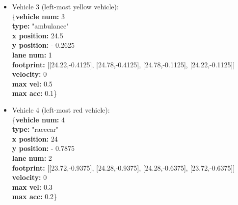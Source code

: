 \begin{itemize}
    \item Vehicle 3 (left-most yellow vehicle):
    \\\hspace*{7.5mm} \{\textbf{vehicle num:} 3
    \\\hspace*{10mm} \textbf{type:} "ambulance"
    \\\hspace*{10mm} \textbf{x position:} 24.5
    \\\hspace*{10mm} \textbf{y position:} - 0.2625
    \\\hspace*{10mm} \textbf{lane num:} 1
    \\\hspace*{10mm} \textbf{footprint:} [[24.22,-0.4125], [24.78,-0.4125], [24.78,-0.1125], [24.22,-0.1125]]
    \\\hspace*{10mm} \textbf{velocity:} 0
    \\\hspace*{10mm} \textbf{max vel:} 0.5
    \\\hspace*{10mm} \textbf{max acc:} 0.1\}
    
    \item Vehicle 4 (left-most red vehicle):
    \\\hspace*{7.5mm} \{\textbf{vehicle num:} 4
    \\\hspace*{10mm} \textbf{type:} "racecar"
    \\\hspace*{10mm} \textbf{x position:} 24
    \\\hspace*{10mm} \textbf{y position:} - 0.7875
    \\\hspace*{10mm} \textbf{lane num:} 2
    \\\hspace*{10mm} \textbf{footprint:} [[23.72,-0.9375], [24.28,-0.9375], [24.28,-0.6375], [23.72,-0.6375]]
    \\\hspace*{10mm} \textbf{velocity:} 0
    \\\hspace*{10mm} \textbf{max vel:} 0.3
    \\\hspace*{10mm} \textbf{max acc:} 0.2\}
\end{itemize}

